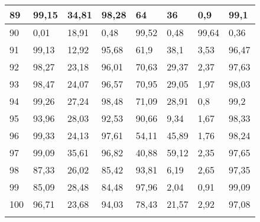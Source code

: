 \begin{longtable}[c]{|l|l|l|l|l|l|l|l|}
89              & 99,15        & 34,81        & 98,28       & 64            & 36            & 0,9           & 99,1          \\ \hline
90              & 0,01         & 18,91        & 0,48        & 99,52         & 0,48          & 99,64         & 0,36          \\ \hline
91              & 99,13        & 12,92        & 95,68       & 61,9          & 38,1          & 3,53          & 96,47         \\ \hline
92              & 98,27        & 23,18        & 96,01       & 70,63         & 29,37         & 2,37          & 97,63         \\ \hline
93              & 98,47        & 24,07        & 96,57       & 70,95         & 29,05         & 1,97          & 98,03         \\ \hline
94              & 99,26        & 27,24        & 98,48       & 71,09         & 28,91         & 0,8           & 99,2          \\ \hline
95              & 93,96        & 28,03        & 92,53       & 90,66         & 9,34          & 1,67          & 98,33         \\ \hline
96              & 99,33        & 24,13        & 97,61       & 54,11         & 45,89         & 1,76          & 98,24         \\ \hline
97              & 99,09        & 35,61        & 96,82       & 40,88         & 59,12         & 2,35          & 97,65         \\ \hline
98              & 87,33        & 26,02        & 85,42       & 93,81         & 6,19          & 2,65          & 97,35         \\ \hline
99              & 85,09        & 28,48        & 84,48       & 97,96         & 2,04          & 0,91          & 99,09         \\ \hline
100             & 96,71        & 23,68        & 94,03       & 78,43         & 21,57         & 2,92          & 97,08         \\ \hline
\label{anx:medialab}
\end{longtable}
